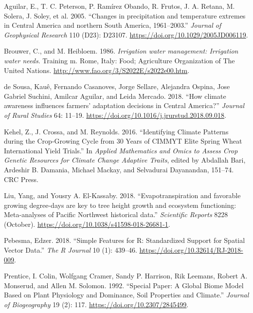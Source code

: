 \documentclass[
]{article}
\newlength{\cslhangindent}
\newenvironment{cslreferences}%
  {\setlength{\parindent}{0pt}%
  \everypar{\setlength{\hangindent}{\cslhangindent}}\ignorespaces}%
  {\par}
\begin{document}
\hypertarget{refs}{}
\begin{cslreferences}
\leavevmode\hypertarget{ref-Aguilar2005}{}%
Aguilar, E., T. C. Peterson, P. Ramírez Obando, R. Frutos, J. A. Retana,
M. Solera, J. Soley, et al. 2005. ``Changes in precipitation and
temperature extremes in Central America and northern South America,
1961--2003.'' \emph{Journal of Geophysical Research} 110 (D23): D23107.
\url{https://doi.org/10.1029/2005JD006119}.

\leavevmode\hypertarget{ref-Brouwer1986}{}%
Brouwer, C., and M. Heibloem. 1986. \emph{Irrigation water management:
Irrigation water needs}. Training m. Rome, Italy: Food; Agriculture
Organization of The United Nations.
\url{http://www.fao.org/3/S2022E/s2022e00.htm}.

\leavevmode\hypertarget{ref-deSousa2018}{}%
de Sousa, Kauê, Fernando Casanoves, Jorge Sellare, Alejandra Ospina,
Jose Gabriel Suchini, Amilcar Aguilar, and Leida Mercado. 2018. ``How
climate awareness influences farmers' adaptation decisions in Central
America?'' \emph{Journal of Rural Studies} 64: 11--19.
\url{https://doi.org/10.1016/j.jrurstud.2018.09.018}.

\leavevmode\hypertarget{ref-Kehel2016}{}%
Kehel, Z., J. Crossa, and M. Reynolds. 2016. ``Identifying Climate
Patterns during the Crop-Growing Cycle from 30 Years of CIMMYT Elite
Spring Wheat International Yield Trials.'' In \emph{Applied Mathematics
and Omics to Assess Crop Genetic Resources for Climate Change Adaptive
Traits}, edited by Abdallah Bari, Ardeshir B. Damania, Michael Mackay,
and Selvadurai Dayanandan, 151--74. CRC Press.

\leavevmode\hypertarget{ref-YLiu2018}{}%
Liu, Yang, and Yousry A. El-Kassaby. 2018. ``Evapotranspiration and
favorable growing degree-days are key to tree height growth and
ecosystem functioning: Meta-analyses of Pacific Northwest historical
data.'' \emph{Scientific Reports} 8228 (October).
\url{https://doi.org/10.1038/s41598-018-26681-1}.

\leavevmode\hypertarget{ref-sf}{}%
Pebesma, Edzer. 2018. ``Simple Features for R: Standardized Support for
Spatial Vector Data.'' \emph{The R Journal} 10 (1): 439--46.
\url{https://doi.org/10.32614/RJ-2018-009}.

\leavevmode\hypertarget{ref-Prentice1992}{}%
Prentice, I. Colin, Wolfgang Cramer, Sandy P. Harrison, Rik Leemans,
Robert A. Monserud, and Allen M. Solomon. 1992. ``Special Paper: A
Global Biome Model Based on Plant Physiology and Dominance, Soil
Properties and Climate.'' \emph{Journal of Biogeography} 19 (2): 117.
\url{https://doi.org/10.2307/2845499}.


\end{cslreferences}
\end{document}

